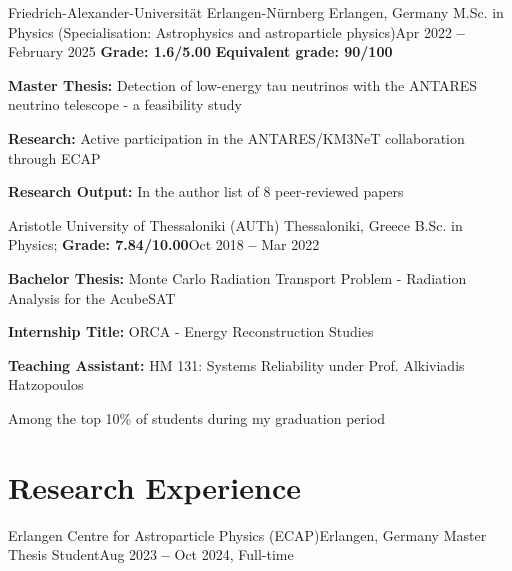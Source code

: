 \documentclass[letterpaper,11pt]{article}
\begin{document}
    \resumeEducationHeading
      {Friedrich-Alexander-Universität Erlangen-Nürnberg
      }{Erlangen, Germany}
      {M.Sc. in Physics (Specialisation: Astrophysics and astroparticle physics)}{Apr 2022 \textbf{--} February 2025}
      {\textbf{Grade: 1.6/5.00} \quad \textbf{Equivalent grade: 90/100}}{}
        \resumeSubHeadingListStart
        \small{\item{
             \textbf{Master Thesis:} Detection of low-energy tau neutrinos with the
                    ANTARES neutrino telescope - a feasibility study}}
        \small{\item{
             \textbf{Research:} Active participation in the ANTARES/KM3NeT collaboration through ECAP}}
        \small{\item{
             \textbf{Research Output:} In the author list of 8 peer-reviewed papers}}
        \resumeSubHeadingListEnd

    \resumeSubheading
    {Aristotle University of Thessaloniki (AUTh)
      }{Thessaloniki, Greece}
      {B.Sc. in Physics;
      \textbf{Grade: 7.84/10.00}}{Oct 2018 \textbf{--} Mar 2022}
        \resumeSubHeadingListStart
        \small{\item{
             \textbf{Bachelor Thesis:} Monte Carlo Radiation Transport Problem - Radiation Analysis for the AcubeSAT}}
        \small{\item{
             \textbf{Internship Title:} ORCA - Energy Reconstruction Studies}}
        \small{\item{
             \textbf{Teaching Assistant:} HM 131: Systems Reliability under Prof. Alkiviadis Hatzopoulos}}
        \small{\item{
            Among the top 10\% of students during my graduation period}}  
        \resumeSubHeadingListEnd
  \resumeSubHeadingListEnd


\section{Research Experience}
  \vspace{3pt}
  \resumeSubHeadingListStart

    \resumeSubheading
      {Erlangen Centre for Astroparticle Physics (ECAP)}{Erlangen, Germany}
      {Master Thesis Student}{Aug 2023 \textbf{--} Oct 2024, Full-time}
        \resumeItemListStart
        \resumeItemListEnd
\end{document}
